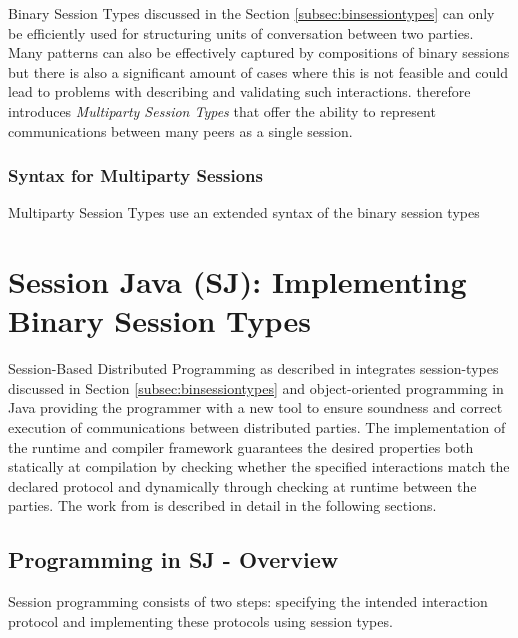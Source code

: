 Binary Session Types discussed in the Section \ref{subsec:binsessiontypes} can only be efficiently used for structuring units of conversation between two parties. Many patterns can also be effectively captured by compositions of binary sessions but there is also a significant amount of cases where this is not feasible and could lead to problems with describing and validating such interactions. \cite{multiparty_sess_types} therefore introduces \textit{Multiparty Session Types} that offer the ability to represent communications between many peers as a single session.

\subsubsection*{Syntax for Multiparty Sessions}

Multiparty Session Types use an extended syntax of the binary session types 



		
		
\section{Session Java (SJ): Implementing Binary Session Types}
\label{sec:sessionj}

	
Session-Based Distributed Programming as described in \cite{sessionbased_programming} integrates session-types discussed in Section \ref{subsec:binsessiontypes} and object-oriented programming in Java providing the programmer with a new tool to ensure soundness and correct execution of communications between distributed parties. The implementation of the runtime and compiler framework guarantees the desired properties both statically at compilation by checking whether the specified interactions match the declared protocol and dynamically through checking at runtime between the parties. The work from \cite{sessionbased_programming} is described in detail in the following sections.

\subsection{Programming in SJ - Overview}
\label{subsec:sjprogram}

Session programming consists of two steps: specifying the intended interaction protocol and implementing these protocols using session types.

